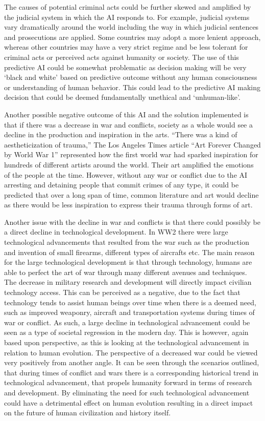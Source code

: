 \documentclass{article}
\begin{document}
The causes of potential criminal acts could be further skewed and amplified by the judicial system in which the AI responds to.  For example, judicial systems vary dramatically around the world including the way in which judicial sentences and prosecutions are applied.  Some countries may adopt a more lenient approach, whereas other countries may have a very strict regime and be less tolerant for criminal acts or perceived acts against humanity or society. The use of this predictive AI could be somewhat problematic as decision making will be very ‘black and white’ based on predictive outcome without any human consciousness or understanding of human behavior.  This could lead to the predictive AI making decision that could be deemed  fundamentally unethical and ‘unhuman-like’.   

Another possible negative outcome of this AI and the solution implemented is that if there was a decrease in war and conflicts, society as a whole would see a decline in the production and inspiration in the arts. “There was a kind of aestheticization of trauma,” \cite{johnson_2012} The Los Angeles Times article “Art Forever Changed by World War 1” represented how the first world war had sparked inspiration for hundreds of different artists around the world. Their art amplified the emotions of the people at the time. However, without any war or conflict due to the AI arresting and detaining people that commit crimes of any type, it could be predicted that over a long span of time, common literature and art would decline as there would be less inspiration to express their trauma through forms of art.

Another issue with the decline in war and conflicts is that there could possibly be a direct decline in technological development. In WW2 there were large technological advancements that resulted from the war such as the production and invention of small firearms, different types of aircrafts etc. \cite{armed-forces-museum_2019} The main reason for the large technological development is that through technology, humans are able to perfect the art of war through many different avenues and techniques. The decrease in military research and development will directly impact civilian technology access. This can be perceived as a negative, due to the fact that technology tends to assist human beings over time when there is a deemed need, such as improved weaponry, aircraft and transportation systems during times of war or conflict. As such, a large decline in technological advancement could be seen as a type of societal regression in the modern day. This is however, again based upon perspective, as this is looking at the technological advancement in relation to human evolution. The perspective of a decreased war could be viewed very positively from another angle.  It can be seen through the scenarios outlined, that during times of conflict and wars there is a corresponding historical trend in technological advancement, that propels humanity forward in terms of research and development. By eliminating the need for such technological advancement could have a detrimental effect on human evolution resulting in a direct impact on the future of human civilization and history itself. 
\end{document}
